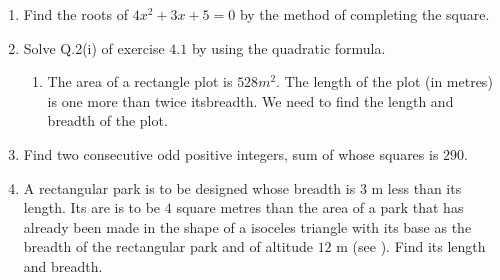 \documentclass{article}
\theoremstyle{remark}
\begin{document}
\begin{enumerate}
\item Find the roots of $4x^2+3x+5 = 0$ by the method of completing the square.
\item Solve Q.2(i) of exercise $4.1$ by using the quadratic formula.
\begin{enumerate}[label=(\roman*)]
\item The area of a rectangle plot is $528 m^2$. The length of the plot (in metres) is one more than twice itsbreadth. We need to find the length and breadth of the plot.
\end{enumerate}
\item Find two consecutive odd positive integers, sum of whose squares is $290$.
\item A rectangular park is to be designed whose breadth is $3$ m less than its length. Its are is to be $4$ square metres than the area of a park that has already been made in the shape of a isoceles triangle with its base as  the breadth of the rectangular park and of altitude $12$ m (see ). Find its length and breadth.
\begin{figure}[h]
\centering

\end{figure}
\end{enumerate}
\end{document}
